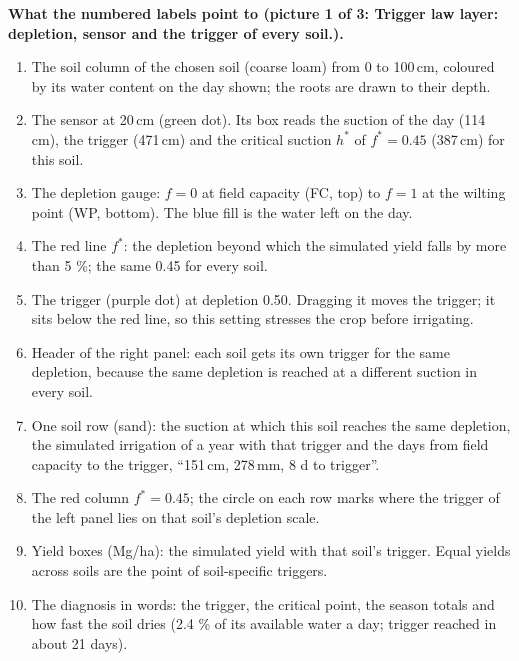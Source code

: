 \textbf{What the numbered labels point to (picture 1 of 3: Trigger law layer: depletion, sensor and the trigger of every soil.).}
\begin{enumerate}[nosep,label=\protect\circled{\arabic*}]
\item The soil column of the chosen soil (coarse loam) from 0 to 100\,cm, coloured by its water content on the day shown; the roots are drawn to their depth.
\item The sensor at 20\,cm (green dot). Its box reads the suction of the day (114\,cm), the trigger (471\,cm) and the critical suction $h^*$ of $f^*=0.45$ (387\,cm) for this soil.
\item The depletion gauge: $f=0$ at field capacity (FC, top) to $f=1$ at the wilting point (WP, bottom). The blue fill is the water left on the day.
\item The red line $f^*$: the depletion beyond which the simulated yield falls by more than 5 \%; the same 0.45 for every soil.
\item The trigger (purple dot) at depletion 0.50. Dragging it moves the trigger; it sits below the red line, so this setting stresses the crop before irrigating.
\item Header of the right panel: each soil gets its own trigger for the same depletion, because the same depletion is reached at a different suction in every soil.
\item One soil row (sand): the suction at which this soil reaches the same depletion, the simulated irrigation of a year with that trigger and the days from field capacity to the trigger, ``151\,cm, 278\,mm, 8 d to trigger''.
\item The red column $f^*=0.45$; the circle on each row marks where the trigger of the left panel lies on that soil's depletion scale.
\item Yield boxes (Mg/ha): the simulated yield with that soil's trigger. Equal yields across soils are the point of soil-specific triggers.
\item The diagnosis in words: the trigger, the critical point, the season totals and how fast the soil dries (2.4 \% of its available water a day; trigger reached in about 21 days).
\end{enumerate}

